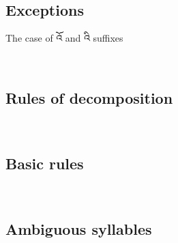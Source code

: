 \documentclass[%
a4paper,%
pagesize,%
12pt,%
parskip=off,%
bibliography=totoc,%
numbers=noenddot,%
DIV=12,%
twoside=semi,%
headings=normal%
]{scrartcl}
\begin{document}
­ 

­\subsection{Exceptions}

The case of འོ and འི suffixes

­\subsection{Rules of decomposition}

­\subsection{Basic rules}

­\subsection{Ambiguous syllables}

­



\end{document}
